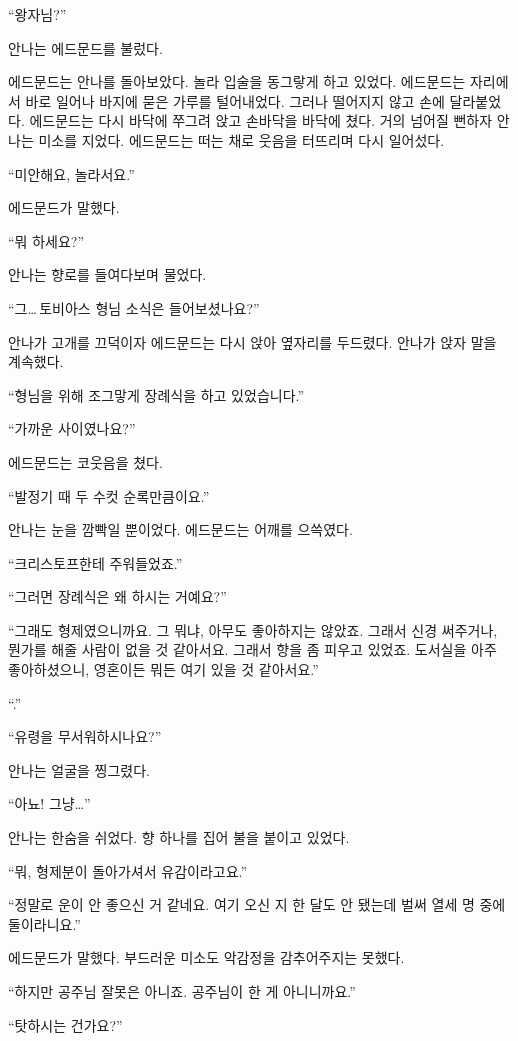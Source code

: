 `` 왕자님?''

안나는 에드문드를 불렀다.

에드문드는 안나를 돌아보았다. 놀라 입술을 동그랗게 하고 있었다. 에드문드는 자리에서 바로 일어나 바지에 묻은 가루를 털어내었다. 그러나 떨어지지 않고 손에 달라붙었다. 에드문드는 다시 바닥에 쭈그려 앉고 손바닥을 바닥에 쳤다. 거의 넘어질 뻔하자 안나는 미소를 지었다. 에드문드는 떠는 채로 웃음을 터뜨리며 다시 일어섰다.

``미안해요, 놀라서요.''

에드문드가 말했다.

``뭐 하세요?''

안나는 향로를 들여다보며 물었다.

``그\ldots\,토비아스 형님 소식은 들어보셨나요?''

안나가 고개를 끄덕이자 에드문드는 다시 앉아 옆자리를 두드렸다. 안나가 앉자 말을 계속했다.

``형님을 위해 조그맣게 장례식을 하고 있었습니다.''

``가까운 사이였나요?''

에드문드는 코웃음을 쳤다.

``발정기 때 두 수컷 순록만큼이요.''

안나는 눈을 깜빡일 뿐이었다. 에드문드는 어깨를 으쓱였다.

``크리스토프한테 주워들었죠.''

``그러면 장례식은 왜 하시는 거예요?''

``그래도 형제였으니까요. 그 뭐냐, 아무도 좋아하지는 않았죠. 그래서 신경 써주거나, 뭔가를 해줄 사람이 없을 것 같아서요. 그래서 향을 좀 피우고 있었죠. 도서실을 아주 좋아하셨으니, 영혼이든 뭐든 여기 있을 것 같아서요.''

``.''

``유령을 무서워하시나요?''

안나는 얼굴을 찡그렸다.

``아뇨! 그냥\ldots''

안나는 한숨을 쉬었다. 향 하나를 집어 불을 붙이고 있었다.

``뭐, 형제분이 돌아가셔서 유감이라고요.''

``정말로 운이 안 좋으신 거 같네요. 여기 오신 지 한 달도 안 됐는데 벌써 열세 명 중에 둘이라니요.''

에드문드가 말했다. 부드러운 미소도 악감정을 감추어주지는 못했다.

``하지만 공주님 잘못은 아니죠. 공주님이 한 게 아니니까요.''

`` 탓하시는 건가요?''

